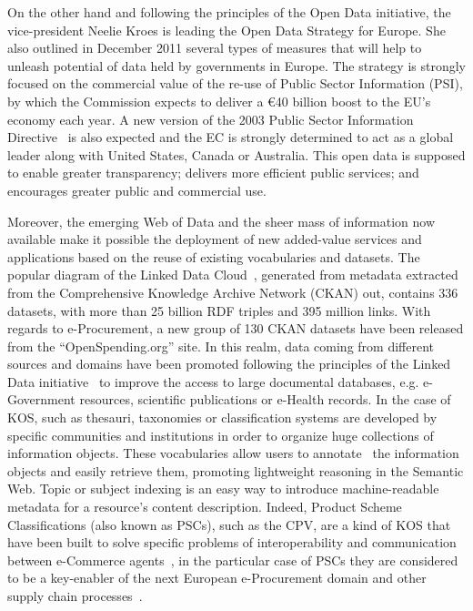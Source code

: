 On the other hand and following the principles of the Open Data initiative, the vice-president Neelie Kroes is leading the Open Data Strategy for Europe. 
She also outlined in December 2011 several types of measures that will help to unleash potential of data held by governments in Europe. The strategy is 
strongly focused on the commercial value of the re-use of Public Sector Information (PSI), by which the Commission expects to deliver a \euro 40 billion boost to the EU's economy each year. 
A new version of the 2003 Public Sector Information Directive~\cite{d2003} is also expected and the EC is strongly determined to act as a global leader along with United States, 
Canada or Australia. This open data is supposed to enable greater transparency; delivers more efficient public services; and encourages greater 
public and commercial use. 


Moreover, the emerging Web of Data and the sheer mass of information now available make it possible the deployment of new 
added-value services and applications based on the reuse of existing vocabularies and datasets. 
The popular diagram of the Linked Data Cloud~\cite{linked-data-cloud}, generated from metadata extracted from the 
Comprehensive Knowledge Archive Network (CKAN) out, contains $336$ datasets, with more than 25 billion RDF triples and 395 million links. 
With regards to e-Procurement, a new group of 130 CKAN datasets have been released from the ``OpenSpending.org'' site. In this realm, 
data coming from different sources and domains have been promoted following the principles of the 
Linked Data initiative~\cite{Berners-Lee-2006} to improve the access to large documental databases, 
e.g. e-Government resources, scientific publications or e-Health records. In the case of KOS, such as thesauri, taxonomies or classification systems 
are developed by specific communities and institutions in order to organize huge collections of information objects. 
These vocabularies allow users to annotate~\cite{Leukel-standard,Leukel-automating,Leukel-comparative} the information objects and easily retrieve them, 
promoting lightweight reasoning in the Semantic Web. Topic or subject indexing is an easy way to introduce machine-readable metadata for a resource's content 
description. Indeed, Product Scheme Classifications (also known as PSCs), such as the CPV, are a kind of KOS that have been built to solve specific problems 
of interoperability and communication between e-Commerce agents~\cite{FenselOmel2001,Leukel-findings}, in the particular case of PSCs they are considered to be a key-enabler of 
the next European e-Procurement domain and other supply chain processes~\cite{DBLP:journals/tcci/Alor-HernandezAJPRMBG10}.

